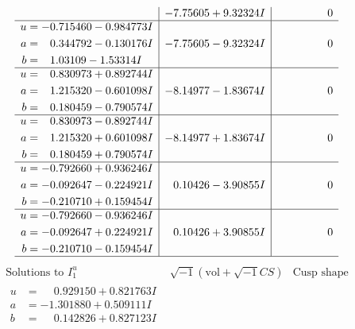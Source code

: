 \documentclass[1p]{elsarticle_modified}
\theoremstyle{definition}
\newcommand{\I}{\sqrt{-1}}
\begin{document}
$$\begin{array}{c|c|c}
 & -7.75605 + 9.32324 I & \phantom{-0.000000 } 0 \\ \hline\begin{aligned}
u &= -0.715460 - 0.984773 I \\
a &= \phantom{-}0.344792 - 0.130176 I \\
b &= \phantom{-}1.03109 - 1.53314 I\end{aligned}
 & -7.75605 - 9.32324 I & \phantom{-0.000000 } 0 \\ \hline\begin{aligned}
u &= \phantom{-}0.830973 + 0.892744 I \\
a &= \phantom{-}1.215320 - 0.601098 I \\
b &= \phantom{-}0.180459 - 0.790574 I\end{aligned}
 & -8.14977 - 1.83674 I & \phantom{-0.000000 } 0 \\ \hline\begin{aligned}
u &= \phantom{-}0.830973 - 0.892744 I \\
a &= \phantom{-}1.215320 + 0.601098 I \\
b &= \phantom{-}0.180459 + 0.790574 I\end{aligned}
 & -8.14977 + 1.83674 I & \phantom{-0.000000 } 0 \\ \hline\begin{aligned}
u &= -0.792660 + 0.936246 I \\
a &= -0.092647 - 0.224921 I \\
b &= -0.210710 + 0.159454 I\end{aligned}
 & \phantom{-}0.10426 - 3.90855 I & \phantom{-0.000000 } 0 \\ \hline\begin{aligned}
u &= -0.792660 - 0.936246 I \\
a &= -0.092647 + 0.224921 I \\
b &= -0.210710 - 0.159454 I\end{aligned}
 & \phantom{-}0.10426 + 3.90855 I & \phantom{-0.000000 } 0\\
 \hline 
 \end{array}$$\newpage$$\begin{array}{c|c|c}  
\text{Solutions to }I^u_{1}& \I (\text{vol} + \sqrt{-1}CS) & \text{Cusp shape}\\
 \hline 
\begin{aligned}
u &= \phantom{-}0.929150 + 0.821763 I \\
a &= -1.301880 + 0.509111 I \\
b &= \phantom{-}0.142826 + 0.827123 I\end{aligned}

\end{array}$$
\end{document}
